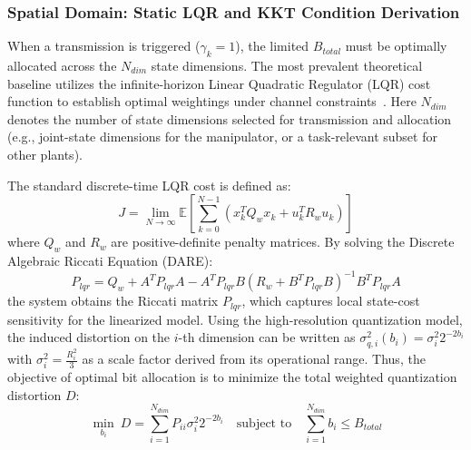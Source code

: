 \subsubsection{Spatial Domain: Static LQR and KKT Condition Derivation}
When a transmission is triggered ($\gamma_k = 1$), the limited $B_{total}$ must be optimally allocated across the $N_{dim}$ state dimensions. The most prevalent theoretical baseline utilizes the infinite-horizon Linear Quadratic Regulator (LQR) cost function to establish optimal weightings under channel constraints~\cite{intro_cucc}.
Here $N_{dim}$ denotes the number of state dimensions selected for transmission and allocation (e.g., joint-state dimensions for the manipulator, or a task-relevant subset for other plants).

The standard discrete-time LQR cost is defined as:
\begin{equation}
    J = \lim_{N \to \infty} \mathbb{E} \left[ \sum_{k=0}^{N-1} (x_k^T Q_w x_k + u_k^T R_w u_k) \right]
\end{equation}
where $Q_w$ and $R_w$ are positive-definite penalty matrices. By solving the Discrete Algebraic Riccati Equation (DARE):
\begin{equation}
    P_{lqr} = Q_w + A^T P_{lqr} A - A^T P_{lqr} B (R_w + B^T P_{lqr} B)^{-1} B^T P_{lqr} A
\end{equation}
the system obtains the Riccati matrix $P_{lqr}$, which captures local state-cost sensitivity for the linearized model. Using the high-resolution quantization model, the induced distortion on the $i$-th dimension can be written as $\sigma_{q,i}^2(b_i)=\sigma_i^2 2^{-2b_i}$ with $\sigma_i^2=\frac{R_i^2}{3}$ as a scale factor derived from its operational range. Thus, the objective of optimal bit allocation is to minimize the total weighted quantization distortion $D$:
\begin{equation} \label{eq:optimization_problem}
    \min_{b_i} \ D = \sum_{i=1}^{N_{dim}} P_{ii} \sigma_i^2 2^{-2b_i} \quad \text{subject to} \quad \sum_{i=1}^{N_{dim}} b_i \le B_{total}
\end{equation}


